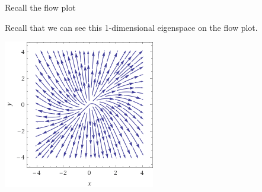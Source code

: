\documentclass{beamer}
\begin{document}
\begin{frame}{Recall the flow plot}


Recall that we can see this 1-dimensional eigenspace on the flow plot.

\pause

\begin{center}
\includegraphics[scale=0.45]{stream1}
\end{center}

\end{frame}
\end{document}
